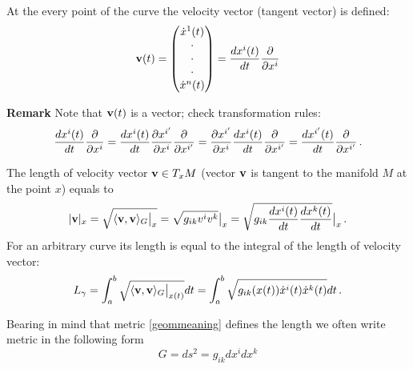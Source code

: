 \documentclass[12pt]{article}
\theoremstyle{theorem}
\numberwithin{equation}{section}
\begin{document}
  At the every point of the curve 
the velocity vector (tangent vector)
  is defined:
\begin{equation*}\label{velvector}
  {\bf v}(t)=\begin{pmatrix}
       \dot x^1 (t)\\
             \cdot\\
             \cdot\\
             \cdot\\
             \dot x^n(t)
         \end{pmatrix}
        ={dx^i(t)\over dt}{\partial\over \partial x^i}
\end{equation*}

{\bf Remark}  Note that ${\bf v}(t)$  is a vector; check transformation rules: 
          \begin{equation*}
       {dx^i(t)\over dt}{\partial\over \partial x^i}=
       {dx^i(t)\over dt}
  {\partial x^{i'}\over \partial x^i}{\partial\over \partial x^{i'}}=
{\partial x^{i'}\over \partial x^i}{dx^i(t)\over dt}
  {\partial\over \partial x^{i'}}=
       {dx^{i'}(t)\over dt}{\partial\over \partial x^{i'}}\,.
  \end{equation*}
        


The length of velocity vector ${\bf v}\in T_xM$
(vector ${\bf v}$ is tangent to the manifold $M$ at the point $x$)
equals to
     \begin{equation*}\label{speedforaunt}
       |{\bf v}|_x=\sqrt {\langle {\bf v},{\bf v}\rangle_G\big\vert_{x}}=
       \sqrt{g_{ik}v^iv^k}\big\vert_{x}=
       \sqrt{g_{ik}{dx^i(t)\over dt}
     {dx^k(t)\over dt}}\big\vert_{x}\,.
     \end{equation*}
For an arbitrary curve its length is equal
 to the integral of the length of velocity vector:
\begin{equation}\label{lengthofthecurve}
  L_\gamma=\int_a^b \sqrt {\langle{\bf v},{\bf v}\rangle_G\big\vert_{x(t)}}dt=
  \int_a^b \sqrt {g_{ik}(x(t))\dot x^i(t) \dot x^k(t)}dt\,.
\end{equation}

Bearing in mind that metric \eqref{geommeaning} defines the length
we often write metric in the following form
\begin{equation*}\label{metric}
  G=ds^2=g_{ik}dx^idx^k
\end{equation*}

\smallskip

\end{document}
